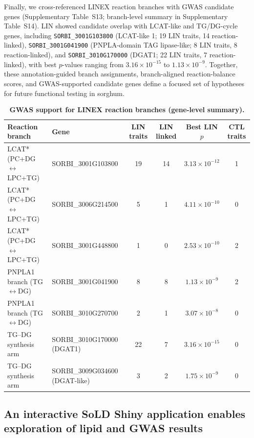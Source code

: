\documentclass[9pt,twocolumn,twoside]{rilabRxiv}
\begin{document}
Finally, we cross-referenced LINEX reaction branches with GWAS candidate genes (Supplementary Table~S13; branch-level summary in Supplementary Table~S14). LIN showed candidate overlap with LCAT-like and TG/DG-cycle genes, including \texttt{SORBI\_3001G103800} (LCAT-like 1; 19 LIN traits, 14 reaction-linked), \texttt{SORBI\_3001G041900} (PNPLA-domain TAG lipase-like; 8 LIN traits, 8 reaction-linked), and \texttt{SORBI\_3010G170000} (DGAT1; 22 LIN traits, 7 reaction-linked), with best \(p\)-values ranging from \(3.16\times10^{-15}\) to \(1.13\times10^{-9}\). Together, these annotation-guided branch assignments, branch-aligned reaction-balance scores, and GWAS-supported candidate genes define a focused set of hypotheses for future functional testing in sorghum.


\begin{table}[!ht]
\centering
\caption{\textbf{GWAS support for LINEX reaction branches (gene-level summary).}}
\label{tab:supp_linex_gwas_branch_summary_compact}
\scriptsize
\begin{tabular}{llcccc}
\toprule
\textbf{Reaction branch} & \textbf{Gene} & \textbf{LIN traits} & \textbf{LIN linked} & \textbf{Best LIN $p$} & \textbf{CTL traits} \\
\midrule
LCAT* (PC+DG$\leftrightarrow$LPC+TG) & SORBI\_3001G103800 & 19 & 14 & $3.13\times10^{-12}$ & 1 \\
LCAT* (PC+DG$\leftrightarrow$LPC+TG) & SORBI\_3006G214500 & 5 & 1 & $4.11\times10^{-10}$ & 0 \\
LCAT* (PC+DG$\leftrightarrow$LPC+TG) & SORBI\_3001G448800 & 1 & 0 & $2.53\times10^{-10}$ & 2 \\
PNPLA1 branch (TG$\leftrightarrow$DG) & SORBI\_3001G041900 & 8 & 8 & $1.13\times10^{-9}$ & 2 \\
PNPLA1 branch (TG$\leftrightarrow$DG) & SORBI\_3010G270700 & 2 & 1 & $3.07\times10^{-8}$ & 0 \\
TG--DG synthesis arm & SORBI\_3010G170000 (DGAT1) & 22 & 7 & $3.16\times10^{-15}$ & 0 \\
TG--DG synthesis arm & SORBI\_3009G034600 (DGAT-like) & 3 & 2 & $1.75\times10^{-9}$ & 0 \\
\bottomrule
\end{tabular}
\end{table}


\subsection{An interactive SoLD Shiny application enables exploration of lipid and GWAS results}
\end{document}

